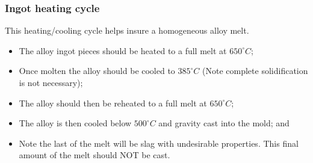 \subsubsection{Ingot heating cycle}

This heating/cooling cycle helps insure a homogeneous alloy melt.
\begin{itemize}
\item The \MgZnCa alloy ingot pieces should be heated to a full melt at $650^{\circ}C$;
\item Once molten the alloy should be cooled to $385^{\circ}C$ (Note complete solidification is not necessary);
\item The alloy should then be reheated to a full melt at $650^{\circ}C$;
\item The alloy is then cooled below $500^{\circ}C$ and gravity cast into the mold; and
\item Note the last of the melt will be slag with undesirable properties. This final amount of the melt should NOT be cast.
\end{itemize}